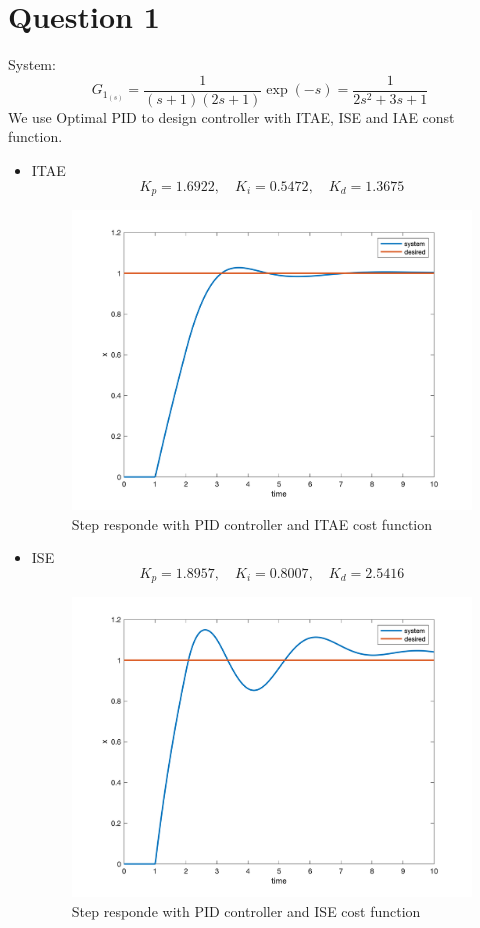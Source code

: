 \section{Question 1}
System:
$$
G_{1_{(s)}} = \dfrac{1}{(s+1)(2s+1)}\exp(-s) = \dfrac{1}{2s^2+3s+1}
$$
We use Optimal PID to design controller with ITAE, ISE and IAE const function.
\newpage
 \begin{itemize}
     \item ITAE
     $$
     K_p = 1.6922, \quad K_i = 0.5472, \quad K_d = 1.3675
     $$
     \begin{figure}[H]
        \caption{Step responde with PID controller and ITAE cost function}
        \centering
        \includegraphics[width=11cm]{../Figure/Q1/ITAE.png}
    \end{figure}
    \item ISE
    $$
    K_p =1.8957, \quad K_i = 0.8007, \quad  K_d =2.5416
    $$
    \begin{figure}[H]
       \caption{Step responde with PID controller and ISE cost function}
       \centering
       \includegraphics[width=11cm]{../Figure/Q1/ISE.png}

\end{figure}
\end{itemize}

